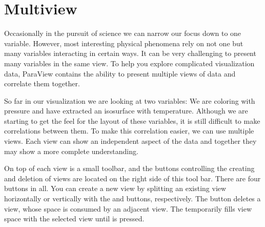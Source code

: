\section{Multiview}
\label{sec:Multiview}

Occasionally in the pursuit of science we can narrow our focus down to one
variable.  However, most interesting physical phenomena rely on not one but
many variables interacting in certain ways.  It can be very challenging to
present many variables in the same view.  To help you explore complicated
visualization data, ParaView contains the ability to present multiple views
of data and correlate them together.

So far in our visualization we are looking at two variables: We are
coloring with pressure and have extracted an isosurface with temperature.
Although we are starting to get the feel for the layout of these variables,
it is still difficult to make correlations between them.  To make this
correlation easier, we can use multiple views.  Each view can show an
independent aspect of the data and together they may show a more complete
understanding.

On top of each view is a small toolbar, and the buttons controlling the
creating and deletion of views are located on the right side of this tool
bar.  There are four buttons in all.  You can create a new view by
splitting an existing view horizontally or vertically with the \splitViewH
and \splitViewV buttons, respectively.  The \deleteView button deletes a
view, whose space is consumed by an adjacent view.  The \maximizeView
temporarily fills view space with the selected view until \restoreView is
pressed.


